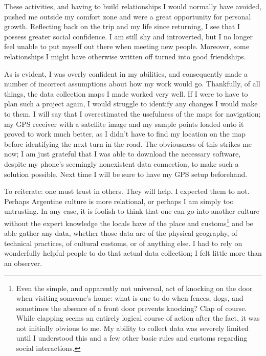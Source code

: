 These activities, and having to build relationships I would normally have avoided, pushed me outside my comfort zone and were a great opportunity for personal growth. Reflecting back on the trip and my life since returning, I see that I possess greater social confidence. I am still shy and introverted, but I no longer feel unable to put myself out there when meeting new people. Moreover, some relationships I might have otherwise written off turned into good friendships.

As is evident, I was overly confident in my abilities, and consequently made a number of incorrect assumptions about how my work would go. Thankfully, of all things, the data collection maps I made worked very well. If I were to have to plan such a project again, I would struggle to identify any changes I would make to them. I will say that I overestimated the usefulness of the maps for navigation; my GPS receiver with a satellite image and my sample points loaded onto it proved to work much better, as I didn't have to find my location on the map before identifying the next turn in the road. The obviousness of this strikes me now; I am just grateful that I was able to download the necessary software, despite my phone’s seemingly nonexistent data connection, to make such a solution possible. Next time I will be sure to have my GPS setup beforehand.

To reiterate: one must trust in others. They will help. I expected them to not. Perhaps Argentine culture is more relational, or perhaps I am simply too untrusting. In any case, it is foolish to think that one can go into another culture without the expert knowledge the locals have of the place and customs\footnote{Even the simple, and apparently not universal, act of knocking on the door when visiting someone's home: what is one to do when fences, dogs, and sometimes the absence of a front door prevents knocking? Clap of course. While clapping seems an entirely logical course of action after the fact, it was not initially obvious to me. My ability to collect data was severely limited until I understood this and a few other basic rules and customs regarding social interactions.} and be able gather any data, whether those data are of the physical geography, of technical practices, of cultural customs, or of anything else. I had to rely on wonderfully helpful people to do that actual data collection; I felt little more than an observer. 